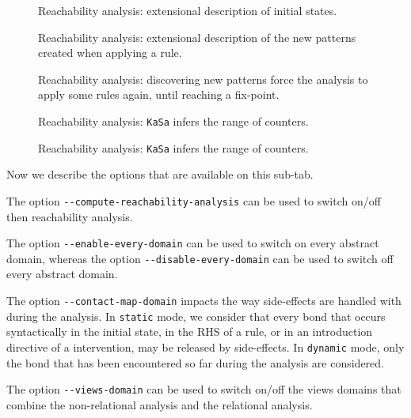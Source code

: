 \documentclass[11pt]{book}
\def\ttt#1{\texttt{#1}}
\begin{document}
\begin{figure}[htbp]

\caption{Reachability analysis: extensional description of initial states.}
\label{fig:reachability_high_init}
\end{figure}

\begin{figure}[htbp]

\caption{Reachability analysis: extensional description of the new patterns  created when applying a rule.}
\label{fig:reachability_high_rule}
\end{figure}

\begin{figure}[htbp]

\caption{Reachability analysis: discovering new patterns force the analysis to apply some rules again, until reaching a fix-point.}
\label{fig:reachability_full}
\end{figure}

\begin{figure}[htbp]

\caption{Reachability analysis: \ttt{KaSa} infers the range of counters.}
\label{fig:reachability_counters}
\end{figure}

\begin{figure}[htbp]

\caption{Reachability analysis: \ttt{KaSa} infers the range of counters.}
\label{fig:reachability_counters_oct}
\end{figure}

Now we describe the options that are available on this sub-tab.

The option \verb?--compute-reachability-analysis? can be used to switch on/off then reachability analysis.

The option \verb?--enable-every-domain? can be used to switch on every abstract domain, whereas the option \verb?--disable-every-domain? can be used to switch off every abstract domain.

The option \verb?--contact-map-domain? impacts the way side-effects are handled with during the analysis. In \verb?static? mode, we consider that every bond that occurs syntactically in the initial state, in the RHS of a rule, or in an introduction directive of a intervention, may be released by side-effects.
In \verb?dynamic? mode, only the bond that has been encountered so far during the analysis are considered.

The option \verb?--views-domain? can be used to switch on/off the views domains that combine the non-relational analysis and the relational analysis.
\end{document}
